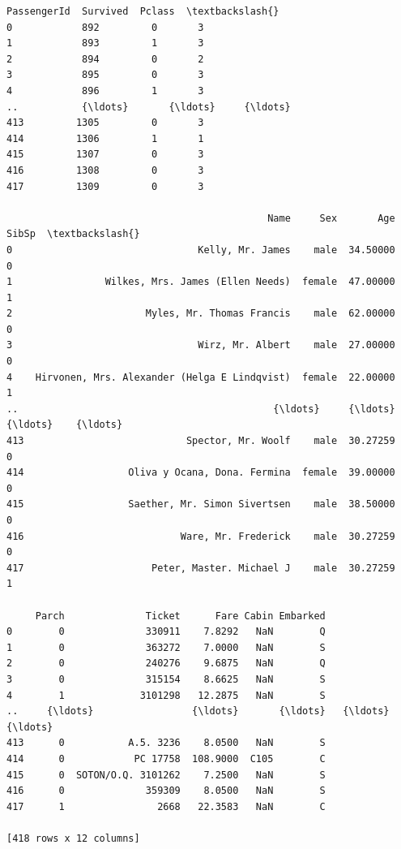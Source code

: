 \documentclass[11pt,a4paper]{report}
\makeatletter
\newcommand{\boxspacing}{\kern\kvtcb@left@rule\kern\kvtcb@boxsep}
\newcommand{\prompt}[4]{
        {\ttfamily\llap{{\color{#2}[#3]:\hspace{3pt}#4}}\vspace{-\baselineskip}}
    }
\makeatother
\begin{document}
            \begin{tcolorbox}[breakable, size=fbox, boxrule=.5pt, pad at break*=1mm, opacityfill=0]
\prompt{Out}{outcolor}{25}{\boxspacing}
\begin{Verbatim}[commandchars=\\\{\}]
     PassengerId  Survived  Pclass  \textbackslash{}
0            892         0       3
1            893         1       3
2            894         0       2
3            895         0       3
4            896         1       3
..           {\ldots}       {\ldots}     {\ldots}
413         1305         0       3
414         1306         1       1
415         1307         0       3
416         1308         0       3
417         1309         0       3

                                             Name     Sex       Age  SibSp  \textbackslash{}
0                                Kelly, Mr. James    male  34.50000      0
1                Wilkes, Mrs. James (Ellen Needs)  female  47.00000      1
2                       Myles, Mr. Thomas Francis    male  62.00000      0
3                                Wirz, Mr. Albert    male  27.00000      0
4    Hirvonen, Mrs. Alexander (Helga E Lindqvist)  female  22.00000      1
..                                            {\ldots}     {\ldots}       {\ldots}    {\ldots}
413                            Spector, Mr. Woolf    male  30.27259      0
414                  Oliva y Ocana, Dona. Fermina  female  39.00000      0
415                  Saether, Mr. Simon Sivertsen    male  38.50000      0
416                           Ware, Mr. Frederick    male  30.27259      0
417                      Peter, Master. Michael J    male  30.27259      1

     Parch              Ticket      Fare Cabin Embarked
0        0              330911    7.8292   NaN        Q
1        0              363272    7.0000   NaN        S
2        0              240276    9.6875   NaN        Q
3        0              315154    8.6625   NaN        S
4        1             3101298   12.2875   NaN        S
..     {\ldots}                 {\ldots}       {\ldots}   {\ldots}      {\ldots}
413      0           A.5. 3236    8.0500   NaN        S
414      0            PC 17758  108.9000  C105        C
415      0  SOTON/O.Q. 3101262    7.2500   NaN        S
416      0              359309    8.0500   NaN        S
417      1                2668   22.3583   NaN        C

[418 rows x 12 columns]
\end{Verbatim}
\end{tcolorbox}
\end{document}
